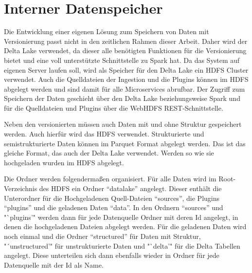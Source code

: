 \section{Interner Datenspeicher}

Die Entwicklung einer eigenen Lösung zum Speichern von Daten mit Versionierung passt nicht in den zeitlichen Rahmen dieser Arbeit.
Daher wird der Delta Lake verwendet, da dieser alle benötigten Funktionen für die Versionierung bietet und eine voll unterstützte Schnittstelle zu Spark hat.
Da das System auf eigenen Server laufen soll, wird als Speicher für den Delta Lake ein HDFS Cluster verwendet.
Auch die Quelldateien der Ingestion und die Plugins können im HDFS abgelegt werden und sind damit für alle Microservices abrufbar.
Der Zugriff zum Speichern der Daten geschieht über den Delta Lake beziehungsweise Spark und für die Quelldateien und Plugins über die WebHDFS REST-Schnittstelle.

Neben den versionierten müssen auch Daten mit und ohne Struktur gespeichert werden.
Auch hierfür wird das HDFS verwendet.
Strukturierte und semistrukturierte Daten können im Parquet Format abgelegt werden.
Das ist das gleiche Format, das auch der Delta Lake verwendet.
Werden so wie sie hochgeladen wurden im HDFS abgelegt.

Die Ordner werden folgendermaßen organisiert.
Für alle Daten wird im Root-Verzeichnis des HDFS ein Ordner "`datalake"' angelegt.
Dieser enthält die Unterordner für die Hochgeladenen Quell-Dateien "`sources"', die Plugins "`plugins"' und die geladenen Daten "`data"'.
In den Ordnern "`sources"' und "`plugins'" werden dann für jede Datenquelle Ordner mit deren Id angelegt, in denen die hochgeladenen Dateien abgelegt werden.
Für die geladenen Daten wird noch einmal und die Ordner "`structured"' für Daten mit Struktur, "´unstructured'" für unstrukturierte Daten und "`delta'" für die Delta Tabellen angelegt.
Diese unterteilen sich dann ebenfalls wieder in Ordner für jede Datenquelle mit der Id als Name.

